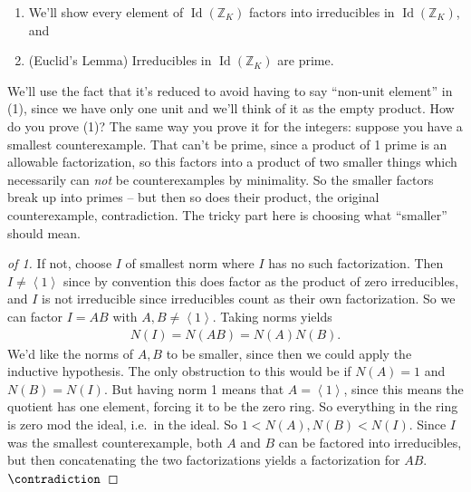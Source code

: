 \begin{proposition}

\begin{enumerate}
\def\labelenumi{\arabic{enumi}.}
\item
  We'll show every element of \(\operatorname{Id}({\mathbb{Z}}_K)\)
  factors into irreducibles in \(\operatorname{Id}({\mathbb{Z}}_K)\),
  and
\item
  (Euclid's Lemma) Irreducibles in \(\operatorname{Id}({\mathbb{Z}}_K)\)
  are prime.
\end{enumerate}

\end{proposition}

\begin{remark}

We'll use the fact that it's reduced to avoid having to say ``non-unit
element'' in (1), since we have only one unit and we'll think of it as
the empty product. How do you prove (1)? The same way you prove it for
the integers: suppose you have a smallest counterexample. That can't be
prime, since a product of 1 prime is an allowable factorization, so this
factors into a product of two smaller things which necessarily can
\emph{not} be counterexamples by minimality. So the smaller factors
break up into primes -- but then so does their product, the original
counterexample, contradiction. The tricky part here is choosing what
``smaller'' should mean.

\end{remark}

\begin{proof}[of 1]

If not, choose \(I\) of smallest norm where \(I\) has no such
factorization. Then \(I \neq \left\langle{ 1 }\right\rangle\) since by
convention this does factor as the product of zero irreducibles, and
\(I\) is not irreducible since irreducibles count as their own
factorization. So we can factor \(I = AB\) with
\(A, B \neq \left\langle{ 1 }\right\rangle\). Taking norms yields
\begin{align*}
N(I) = N(AB) = N(A) N(B)
.\end{align*}
We'd like the norms of \(A, B\) to be smaller, since then we could apply
the inductive hypothesis. The only obstruction to this would be if
\(N(A) = 1\) and \(N(B) = N(I)\). But having norm 1 means that
\(A = \left\langle{ 1 }\right\rangle\), since this means the quotient
has one element, forcing it to be the zero ring. So everything in the
ring is zero mod the ideal, i.e.~in the ideal. So
\(1 < N(A), N(B) < N(I)\). Since \(I\) was the smallest counterexample,
both \(A\) and \(B\) can be factored into irreducibles, but then
concatenating the two factorizations yields a factorization for \(AB\).
\(\contradiction\)

\end{proof}

